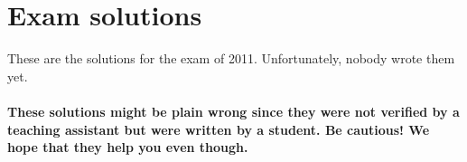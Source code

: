 \documentclass[main]{subfiles}
\begin{document}

\section{Exam solutions}
These are the solutions for the exam of 2011. Unfortunately, nobody wrote them yet.
\\\\
\textbf{These solutions might be plain wrong since they were not verified by a teaching assistant but were written by a student. Be cautious! We hope that they help you even though.}

\end{document}
